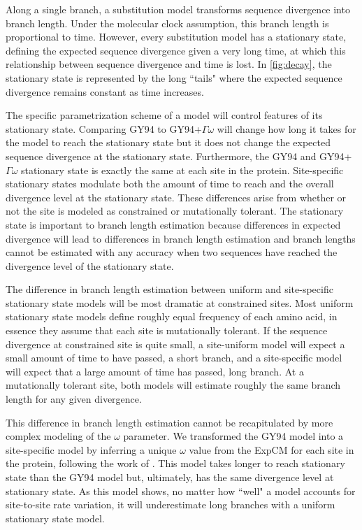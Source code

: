 \documentclass[11pt]{article}
\begin{document}
Along a single branch, a substitution model transforms sequence divergence into branch length. 
Under the molecular clock assumption, this branch length is proportional to time.  
However, every substitution model has a stationary state, defining the expected sequence divergence given a very long time, at which this relationship between sequence divergence and time is lost. 
In \ref{fig:decay}, the stationary state is represented by the long ``tails" where the expected sequence divergence remains constant as time increases. 

The specific parametrization scheme of a model will control features of its stationary state. 
Comparing GY94 to GY94+$\Gamma\omega$ will change how long it takes for the model to reach the stationary state but it does not change the expected sequence divergence at the stationary state. 
Furthermore, the GY94 and GY94+$\Gamma\omega$ stationary state is exactly the same at each site in the protein. 
Site-specific stationary states modulate both the amount of time to reach and the overall divergence level at the stationary state. 
These differences arise from whether or not the site is modeled as constrained or mutationally tolerant.  
The stationary state is important to branch length estimation because differences in expected divergence will lead to differences in branch length estimation and branch lengths cannot be estimated with any accuracy when two sequences have reached the divergence level of the stationary state. 

The difference in branch length estimation between uniform and site-specific stationary state models will be most dramatic at constrained sites. 
Most uniform stationary state models define roughly equal frequency of each amino acid, in essence they assume that each site is mutationally tolerant. 
If the sequence divergence at constrained site is quite small, a site-uniform model will expect a small amount of time to have passed, a short branch, and a site-specific model will expect that a large amount of time has passed, long branch. 
At a mutationally tolerant site, both models will estimate roughly the same branch length for any given divergence. 

This difference in branch length estimation cannot be recapitulated by more complex modeling of the $\omega$ parameter. 
We transformed the GY94 model into a site-specific model by inferring a unique $\omega$ value from the ExpCM for each site in the protein, following the work of \cite{spielman2015relationship}. 
This model takes longer to reach stationary state than the GY94 model but, ultimately, has the same divergence level at stationary state. 
As this model shows, no matter how ``well" a model accounts for site-to-site rate variation, it will underestimate long branches with a uniform stationary state model.  
\end{document}
